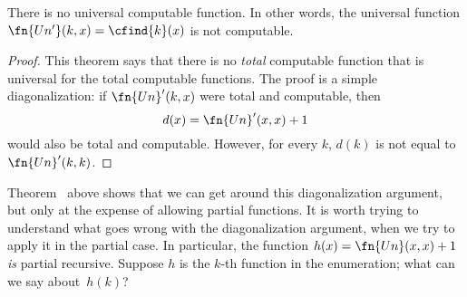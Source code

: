 \documentclass[../../../include/open-logic-section]{subfiles}
\begin{document}

\begin{thm}
There is no universal computable function. In other words, the
universal function $\fn{Un'}(k, x) = \cfind{k}(x)$ is not
computable.
\end{thm}

\begin{proof}
This theorem says that there is no {\em total} computable
function that is universal for the total computable functions. The
proof is a simple diagonalization: if $\fn{Un}'(k,x)$ were total and
computable, then
\[
d(x) = \fn{Un}'(x, x) + 1
\]
would also be total and computable. However, for every $k$, $d(k)$ is
not equal to $\fn{Un}'(k,k)$.
\end{proof}

\begin{explain}
Theorem~ above shows that we can get around
this diagonalization argument, but only at the expense of allowing
partial functions. It is worth trying to understand what goes wrong
with the diagonalization argument, when we try to apply it in the
partial case. In particular, the function $h(x) = \fn{Un}(x,x)+1$
\emph{is} partial recursive. Suppose $h$ is the $k$-th function in the
enumeration; what can we say about~$h(k)$?
\end{explain}
\end{document}
